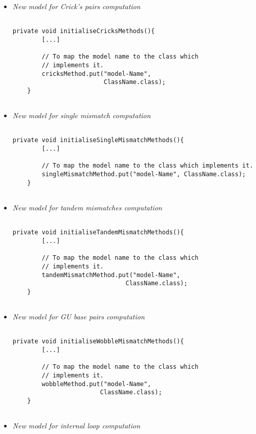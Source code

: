 \documentclass{article}
\begin{document}
\begin{itemize}
\item \textit{New model for Crick's pairs computation}

\begin{verbatim}

private void initialiseCricksMethods(){
		[...]
		
		// To map the model name to the class which 
		// implements it.
        cricksMethod.put("model-Name", 
                         ClassName.class);
	}
	
\end{verbatim}

\item \textit{New model for single mismatch computation}

\begin{verbatim}

private void initialiseSingleMismatchMethods(){
		[...]
		
		// To map the model name to the class which implements it.
        singleMismatchMethod.put("model-Name", ClassName.class);
	}
	
\end{verbatim}

\item \textit{New model for tandem mismatches computation}

\begin{verbatim}

private void initialiseTandemMismatchMethods(){
		[...]
		
		// To map the model name to the class which 
		// implements it.
        tandemMismatchMethod.put("model-Name", 
                               ClassName.class);
	}
	
\end{verbatim}

\item \textit{New model for GU base pairs computation}

\begin{verbatim}

private void initialiseWobbleMismatchMethods(){
		[...]
		
		// To map the model name to the class which 
		// implements it.
        wobbleMethod.put("model-Name", 
                        ClassName.class);
	}
	
\end{verbatim}

\item \textit{New model for internal loop computation}


\end{itemize}
\end{document}
